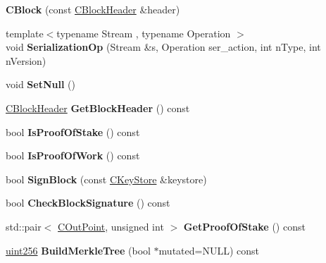 \begin{DoxyCompactItemize}
\item 
\mbox{\label{class_c_block_aaeb7e05f86d36f481bbc2802768256bc}} 
{\bfseries C\+Block} (const \mbox{\hyperlink{class_c_block_header}{C\+Block\+Header}} \&header)
\item 
\mbox{\label{class_c_block_aa83bbf64300154e8919249f7778f4c17}} 
{\footnotesize template$<$typename Stream , typename Operation $>$ }\\void {\bfseries Serialization\+Op} (Stream \&s, Operation ser\+\_\+action, int n\+Type, int n\+Version)
\item 
\mbox{\label{class_c_block_a0410d7ba8d60679c4cf364b82ffffea5}} 
void {\bfseries Set\+Null} ()
\item 
\mbox{\label{class_c_block_a7c8d280db581c02f49a66a5cdef2eded}} 
\mbox{\hyperlink{class_c_block_header}{C\+Block\+Header}} {\bfseries Get\+Block\+Header} () const
\item 
\mbox{\label{class_c_block_ab70bdac61ff8eca54fd29c835cb4f025}} 
bool {\bfseries Is\+Proof\+Of\+Stake} () const
\item 
\mbox{\label{class_c_block_ad3936367b1b6d5289bb60b42967156ea}} 
bool {\bfseries Is\+Proof\+Of\+Work} () const
\item 
\mbox{\label{class_c_block_a9bb6e84becb89ae53a2251d28732420c}} 
bool {\bfseries Sign\+Block} (const \mbox{\hyperlink{class_c_key_store}{C\+Key\+Store}} \&keystore)
\item 
\mbox{\label{class_c_block_a2ff0deeda85c23cde1a78365d6fc6c2c}} 
bool {\bfseries Check\+Block\+Signature} () const
\item 
\mbox{\label{class_c_block_ab3e641daba5dd1a50fafc450ea8b2230}} 
std\+::pair$<$ \mbox{\hyperlink{class_c_out_point}{C\+Out\+Point}}, unsigned int $>$ {\bfseries Get\+Proof\+Of\+Stake} () const
\item 
\mbox{\label{class_c_block_aa65a6589dd8d0ce85d966eeb50a0723a}} 
\mbox{\hyperlink{classuint256}{uint256}} {\bfseries Build\+Merkle\+Tree} (bool $\ast$mutated=N\+U\+LL) const

\end{DoxyCompactItemize}
